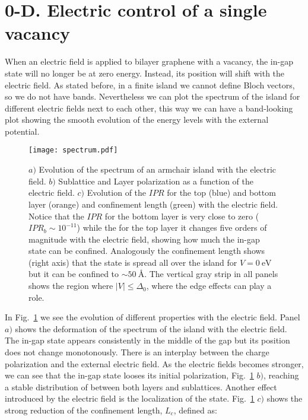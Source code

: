 \documentclass[a4paper]{article}
\begin{document}
\section{0-D. Electric control of a single vacancy} %
When an electric field is applied to bilayer graphene with a vacancy, the in-gap state will no longer be at zero energy. Instead, its position will shift with the electric field. As stated before, in a finite island we cannot define Bloch vectors, so we do not have bands. Nevertheless we can plot the spectrum of the island for different electric fields next to each other, this way we can have a band-looking plot showing the smooth evolution of the energy levels with the external potential.
\begin{figure}[!ht!]
\centering
\texttt{[image: spectrum.pdf]}
\vspace{-20pt}
\caption{$a)$ Evolution of the spectrum of an armchair island with the electric field. $b)$ Sublattice and Layer polarization as a function of the electric field. $c)$ Evolution of the $IPR$ for the top (blue) and bottom layer (orange) and confinement length (green) with the electric field. Notice that the $IPR$ for the bottom layer is very close to zero ($IPR_b\sim10^{-11}$) while the for the top layer it changes five orders of magnitude with the electric field, showing how much the in-gap state can be confined. Analogously the confinement length shows (right axis) that the state is spread all over the island for $V=\SI{0}{\eV}$ but it can be confined to $\sim\SI{50}{\angstrom}$. The vertical gray strip in all panels shows the region where $|V|\leqslant\Delta_0$, where the edge effects can play a role.}
\label{spectrum}
\end{figure}
In Fig.~\ref{spectrum} we see the evolution of different properties with the electric field. Panel $a)$ shows the deformation of the spectrum of the island with the electric field. The in-gap state appears consistently in the middle of the gap but its position does not change monotonously. There is an interplay between the charge polarization and the external electric field.
As the electric fields becomes stronger, we can see that the in-gap state looses its initial polarization, Fig.~\ref{spectrum} $b)$, reaching a stable distribution of between both layers and sublattices. Another effect introduced by the electric field is the localization of the state. Fig.~\ref{spectrum} $c)$ shows the strong reduction of the confinement length, $L_c$, defined as:
\end{document}
